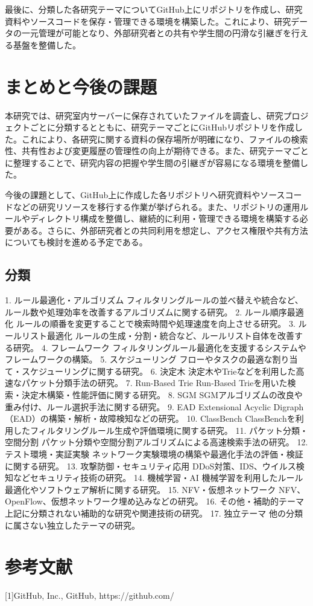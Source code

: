 \documentclass[
  10pt,       %
  twocolumn   %
]{jlreq}      %
\begin{document}
最後に、分類した各研究テーマについてGitHub上にリポジトリを作成し、研究資料やソースコードを保存・管理できる環境を構築した。これにより、研究データの一元管理が可能となり、外部研究者との共有や学生間の円滑な引継ぎを行える基盤を整備した。

\section{まとめと今後の課題}\label{sec:Section}  %
本研究では、研究室内サーバーに保存されていたファイルを調査し、研究プロジェクトごとに分類するとともに、研究テーマごとにGitHubリポジトリを作成した。これにより、各研究に関する資料の保存場所が明確になり、ファイルの検索性、共有性および変更履歴の管理性の向上が期待できる。また、研究テーマごとに整理することで、研究内容の把握や学生間の引継ぎが容易になる環境を整備した。

今後の課題として、GitHub上に作成した各リポジトリへ研究資料やソースコードなどの研究リソースを移行する作業が挙げられる。また、リポジトリの運用ルールやディレクトリ構成を整備し、継続的に利用・管理できる環境を構築する必要がある。さらに、外部研究者との共同利用を想定し、アクセス権限や共有方法についても検討を進める予定である。

\subsection{分類}\label{sec:Section}  %
1. ルール最適化・アルゴリズム	フィルタリングルールの並べ替えや統合など、ルール数や処理効率を改善するアルゴリズムに関する研究。
2. ルール順序最適化	ルールの順番を変更することで検索時間や処理速度を向上させる研究。
3. ルールリスト最適化	ルールの生成・分割・統合など、ルールリスト自体を改善する研究。
4. フレームワーク	フィルタリングルール最適化を支援するシステムやフレームワークの構築。
5. スケジューリング	フローやタスクの最適な割り当て・スケジューリングに関する研究。
6. 決定木	決定木やTrieなどを利用した高速なパケット分類手法の研究。
7. Run-Based Trie	Run-Based Trieを用いた検索・決定木構築・性能評価に関する研究。
8. SGM	SGMアルゴリズムの改良や重み付け、ルール選択手法に関する研究。
9. EAD	Extensional Acyclic Digraph（EAD）の構築・解析・故障検知などの研究。
10. ClassBench	ClassBenchを利用したフィルタリングルール生成や評価環境に関する研究。
11. パケット分類・空間分割	パケット分類や空間分割アルゴリズムによる高速検索手法の研究。
12. テスト環境・実証実験	ネットワーク実験環境の構築や最適化手法の評価・検証に関する研究。
13. 攻撃防御・セキュリティ応用	DDoS対策、IDS、ウイルス検知などセキュリティ技術の研究。
14. 機械学習・AI	機械学習を利用したルール最適化やソフトウェア解析に関する研究。
15. NFV・仮想ネットワーク	NFV、OpenFlow、仮想ネットワーク埋め込みなどの研究。
16. その他・補助的テーマ	上記に分類されない補助的な研究や関連技術の研究。
17. 独立テーマ	他の分類に属さない独立したテーマの研究。

\section{参考文献}\label{sec:Section}  %
[1]GitHub, Inc., GitHub, https://github.com/
   
\end{document}

